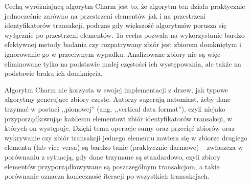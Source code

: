 Cechą wyróżniającą algorytm Charm jest to, że algorytm ten działa praktycznie jednocześnie zarówno na przestrzeni elementów jak i na przestrzeni identyfikatorów transakcji, podczas gdy większość algorytmów porusza się wyłącznie po przestrzeni elementów. Ta cecha pozwala na wykorzystanie bardzo efektywnej metody badania czy rozpatrywany zbiór jest zbiorem domkniętym i ignorowanie go w przeciwnym wypadku. Analizowane zbiory nie są więc eliminowane tylko na podstawie małej częstości ich występowania, ale także na podstawie braku ich domknięcia.

Algorytm Charm nie korzysta w swojej implementacji z drzew, jak typowe algorytmy generujące zbiory częste. Autorzy sugerują natomiast, żeby dane trzymać w postaci ,,pionowej'' (ang. ,,vertical data format''), czyli niejako przyporządkowując każdemu elementowi zbiór identyfikatorów transakcji, w których on występuje. Dzięki temu operacje sumy oraz przecięć zbiorów oraz wykrywanie czy zbiór transakcji jednego elementu zawiera się w zbiorze drugiego elementu (lub vice versa) są bardzo tanie (praktycznie darmowe) -- zwłaszcza w porównaniu z sytuacją, gdy dane trzymane są standardowo, czyli zbiory elementów przyporządkowywane są poszczególnym transakcjom, a takie porównanie oznacza konieczność iteracji po wszystkich transakcjach.
